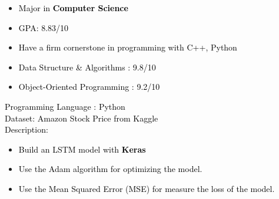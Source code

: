 \documentclass[10pt,a4paper,ragged2e,withhyper]{altacv}
\begin{document}
\begin{paracol}{2}
        

            \begin{itemize}
                \item \textcolor{black}{Major in \textbf{Computer Science}}
                \item \textcolor{black}{GPA: 8.83/10}
                \item \textcolor{black}{Have a firm cornerstone in programming with C++, Python}
                \item \textcolor{black}{Data Structure \& Algorithms : 9.8/10}
                \item \textcolor{black}{Object-Oriented Programming : 9.2/10}

            \end{itemize}
        
            \textcolor{black}{Programming Language : Python} \\
            \vspace{0.5em}
            \textcolor{black}{Dataset: Amazon Stock Price from Kaggle} \\
            \vspace{0.5em}
            \textcolor{black}{Description:} \\
            \vspace{0.5em}
            \begin{itemize}
                \item \textcolor{black}{Build an LSTM model with \textbf{Keras}}
                \item \textcolor{black}{Use the Adam algorithm for optimizing the model.}
                \item \textcolor{black}{Use the Mean Squared Error (MSE) for measure the loss of the model.}
            \end{itemize}


\end{paracol}
\end{document}
